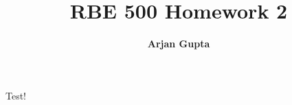 \documentclass{article}
\title{
    \vspace{2in}
    \textmd{\textbf{RBE 500 Homework 2}}\\
    \vspace{1in}
}
\author{\textbf{Arjan Gupta}}
\begin{document}
    \maketitle
    \vspace{5in}
    Test!
\end{document}
